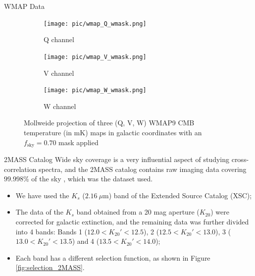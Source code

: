 \documentclass[serif, aspectratio=169]{beamer}
\begin{document}
\begin{frame}{WMAP Data}
    \begin{figure}
        \centering
        \begin{subfigure}[b]{0.32\linewidth}
            \texttt{[image: pic/wmap\_Q\_wmask.png]}
            \caption{Q channel}
            \label{fig:wmap_Q}
        \end{subfigure}
        \hfill
        \begin{subfigure}[b]{0.32\linewidth}
            \texttt{[image: pic/wmap\_V\_wmask.png]}
            \caption{V channel}
            \label{fig:wmap_V}
        \end{subfigure}
        \hfill
        \begin{subfigure}[b]{0.32\linewidth}
            \texttt{[image: pic/wmap\_W\_wmask.png]}
            \caption{W channel}
            \label{fig:wmap_W}
        \end{subfigure}
    \caption{Mollweide projection of three (Q, V, W) WMAP9 CMB temperature (in mK) maps in galactic coordinates with an $f_\text{sky}=0.70$ mask applied}
    \label{fig:wmap_maps}
    \end{figure}
\end{frame}

\begin{frame}{2MASS Catalog}
Wide sky coverage is a very influential aspect of studying cross-correlation spectra, and the 2MASS catalog contains raw imaging data covering $99.998\%$ of the sky \cite{2MASS}, which was the dataset used. 

\begin{itemize}
	\item We have used the $K_s$ ($\SI{2.16}{\mu \meter}$) band of the Extended Source Catalog (XSC);
	\item The data of the $K_s$ band obtained from a 20 mag aperture ($K_{20}$) were corrected for galactic extinction, and the remaining data was further divided into 4 bands: Bands 1 ($12.0<K_{20}'<12.5$), 2 ($12.5<K_{20}'<13.0$), 3 ($13.0<K_{20}'<13.5$) and 4 ($13.5<K_{20}'<14.0$);
	\item Each band has a different selection function, as shown in Figure \ref{fig:selection_2MASS}.
\end{itemize}
\end{frame}
\end{document}
